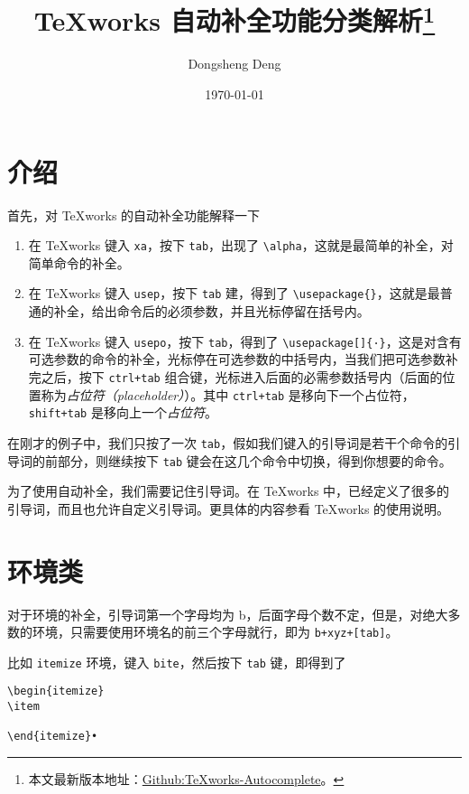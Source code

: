 \documentclass[blue,cn,normal,11pt]{elegantnote}
\title{\TeX{}works 自动补全功能分类解析\footnote{本文最新版本地址：\href{https://github.com/EthanDeng/texworks-autocomplete}{Github:TeXworks-Autocomplete}。}}
\author{Dongsheng Deng}
\institute{Elegant\LaTeX{} 项目组}
\date{\today}
\begin{document}
\maketitle



\section{介绍}

首先，对 \TeX{}works 的自动补全功能解释一下

\begin{enumerate}
\item  在 \TeX{}works 键入 \lstinline{xa}，按下 \lstinline{tab}，出现了 \lstinline{\alpha}，这就是最简单的补全，对简单命令的补全。
\item 在 \TeX{}works 键入 \lstinline{usep}，按下 \lstinline{tab} 建，得到了 \lstinline|\usepackage{}|，这就是最普通的补全，给出命令后的必须参数，并且光标停留在括号内。
\item 在 \TeX{}works 键入 \lstinline{usepo}，按下 \lstinline{tab}，得到了 \lstinline|\usepackage[]{·}|，这是对含有可选参数的命令的补全，光标停在可选参数的中括号内，当我们把可选参数补完之后，按下 \lstinline{ctrl+tab} 组合键，光标进入后面的必需参数括号内（后面的位置称为\textit{占位符（placeholder）}）。其中 \lstinline{ctrl+tab} 是移向下一个占位符，\lstinline{shift+tab} 是移向上一个\textit{占位符}。
\end{enumerate}

在刚才的例子中，我们只按了一次 \lstinline{tab}，假如我们键入的引导词是若干个命令的引导词的前部分，则继续按下 \lstinline{tab} 键会在这几个命令中切换，得到你想要的命令。

为了使用自动补全，我们需要记住引导词。在 \TeX{}works 中，已经定义了很多的引导词，而且也允许自定义引导词。更具体的内容参看 \TeX{}works 的使用说明。

\section{环境类}

对于环境的补全，引导词第一个字母均为 b，后面字母个数不定，但是，对绝大多数的环境，只需要使用环境名的前三个字母就行，即为 \lstinline{b+xyz+[tab]}。

 

比如 \lstinline{itemize} 环境，键入 \lstinline{bite}，然后按下 \lstinline{tab} 键，即得到了

\begin{lstlisting}[frame=single]
\begin{itemize}
\item

\end{itemize}•
\end{lstlisting}
\end{document}
